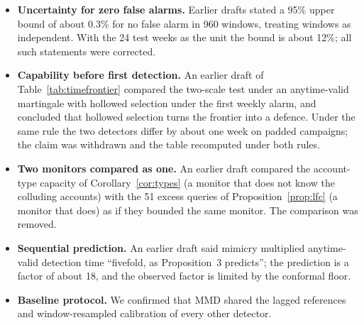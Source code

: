 \begin{itemize}
\item \textbf{Uncertainty for zero false alarms.} Earlier drafts stated a 95\% upper bound of about 0.3\% for no false alarm in 960 windows, treating windows as independent. With the 24 test weeks as the unit the bound is about 12\%; all such statements were corrected.
\item \textbf{Capability before first detection.} An earlier draft of Table~\ref{tab:timefrontier} compared the two-scale test under an anytime-valid martingale with hollowed selection under the first weekly alarm, and concluded that hollowed selection turns the frontier into a defence. Under the same rule the two detectors differ by about one week on padded campaigns; the claim was withdrawn and the table recomputed under both rules.
\item \textbf{Two monitors compared as one.} An earlier draft compared the account-type capacity of Corollary~\ref{cor:types} (a monitor that does not know the colluding accounts) with the 51 excess queries of Proposition~\ref{prop:lfc} (a monitor that does) as if they bounded the same monitor. The comparison was removed.
\item \textbf{Sequential prediction.} An earlier draft said mimicry multiplied anytime-valid detection time ``fivefold, as Proposition~3 predicts''; the prediction is a factor of about 18, and the observed factor is limited by the conformal floor.
\item \textbf{Baseline protocol.} We confirmed that MMD shared the lagged references and window-resampled calibration of every other detector.
\end{itemize}
